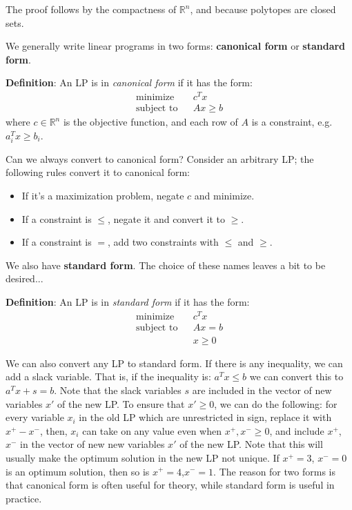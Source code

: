 \documentclass{article}
\newcommand{\reals}{\mathbb{R}}
\begin{document}
The proof follows by the compactness of $\reals^n$, and because
polytopes are closed sets.

We generally write linear programs in two forms: \textbf{canonical
  form} or \textbf{standard form}.

\textbf{Definition}:
  An LP is in \emph{canonical form} if it has the form:
  \begin{eqnarray*}
    \textrm{minimize } & & c^T x\\
    \textrm{subject to} & & Ax \geq b
  \end{eqnarray*}
  where $c \in \reals^n$ is the objective function, and each row of
  $A$ is a constraint, e.g. $a_i^T x \geq b_i$.

Can we always convert to canonical form?  Consider an arbitrary LP;
the following rules convert it to canonical form:

\begin{itemize}
\item If it's a maximization problem, negate $c$ and minimize.
\item If a constraint is $\leq$, negate it and convert it to $\geq$.
\item If a constraint is $=$, add two constraints with $\leq$ and
  $\geq$.
\end{itemize}

We also have \textbf{standard form}.  The choice of these names leaves
a bit to be desired...

\textbf{Definition}:
  An LP is in \emph{standard form} if it has the form:
  \begin{eqnarray*}
    \textrm{minimize } & & c^T x\\
    \textrm{subject to} & & Ax = b\\
    && x \geq 0
  \end{eqnarray*}

We can also convert any LP to standard form.  If there is any
inequality, we can add a slack variable.  That is, if the inequality
is: $a^T x \leq b$ we can convert this to $a^T x + s = b$. Note that the slack variables $s$ are included in the vector of new variables $x'$ of the new LP. To ensure
that $x' \geq 0$, we can do the following: for every variable $x_i$ in the old LP which are unrestricted in sign,
replace it with $x^+ - x^-$, then, $x_i$ can take on any value even when
$x^+, x^- \geq 0$, and include $x^+$, $x^-$ in the vector of new new variables $x'$ of the new LP. Note that this will usually make the optimum solution in the new LP not unique. If $x^+=3$, $x^-=0$ is an optimum solution, then so is $x^+=4$,$x^-=1$. The reason for two forms is that canonical form is
often useful for theory, while standard form is useful in practice.
\end{document}

